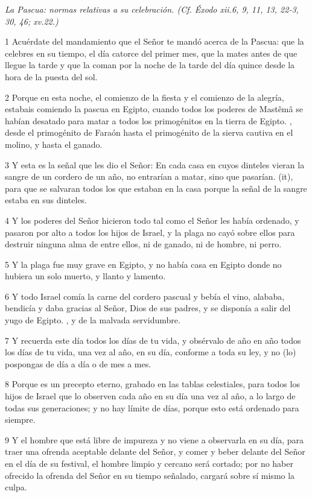 \par \textit{La Pascua: normas relativas a su celebración. (Cf. Éxodo xii.6, 9, 11, 13, 22-3, 30, 46; xv.22.)}

\par 1 Acuérdate del mandamiento que el Señor te mandó acerca de la Pascua: que la celebres en su tiempo, el día catorce del primer mes, que la mates antes de que llegue la tarde y que la coman por la noche de la tarde del día quince desde la hora de la puesta del sol.
\par 2 Porque en esta noche, el comienzo de la fiesta y el comienzo de la alegría, estabais comiendo la pascua en Egipto, cuando todos los poderes de Mastêmâ se habían desatado para matar a todos los primogénitos en la tierra de Egipto. , desde el primogénito de Faraón hasta el primogénito de la sierva cautiva en el molino, y hasta el ganado.
\par 3 Y esta es la señal que les dio el Señor: En cada casa en cuyos dinteles vieran la sangre de un cordero de un año, no entrarían a matar, sino que pasarían. (it), para que se salvaran todos los que estaban en la casa porque la señal de la sangre estaba en sus dinteles.
\par 4 Y los poderes del Señor hicieron todo tal como el Señor les había ordenado, y pasaron por alto a todos los hijos de Israel, y la plaga no cayó sobre ellos para destruir ninguna alma de entre ellos, ni de ganado, ni de hombre, ni perro.
\par 5 Y la plaga fue muy grave en Egipto, y no había casa en Egipto donde no hubiera un solo muerto, y llanto y lamento.
\par 6 Y todo Israel comía la carne del cordero pascual y bebía el vino, alababa, bendicía y daba gracias al Señor, Dios de sus padres, y se disponía a salir del yugo de Egipto. , y de la malvada servidumbre.
\par 7 Y recuerda este día todos los días de tu vida, y obsérvalo de año en año todos los días de tu vida, una vez al año, en su día, conforme a toda su ley, y no (lo) pospongas de día a día o de mes a mes.
\par 8 Porque es un precepto eterno, grabado en las tablas celestiales, para todos los hijos de Israel que lo observen cada año en su día una vez al año, a lo largo de todas sus generaciones; y no hay límite de días, porque esto está ordenado para siempre.
\par 9 Y el hombre que está libre de impureza y no viene a observarla en su día, para traer una ofrenda aceptable delante del Señor, y comer y beber delante del Señor en el día de su festival, el hombre limpio y cercano será cortado; por no haber ofrecido la ofrenda del Señor en su tiempo señalado, cargará sobre sí mismo la culpa.

